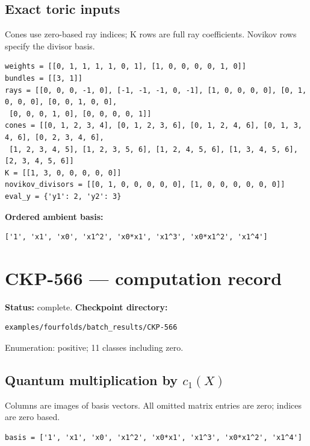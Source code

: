 \documentclass[10pt,a4paper]{article}
\begin{document}
\subsection*{Exact toric inputs}
Cones use zero-based ray indices; K rows are full ray coefficients. Novikov rows specify the divisor basis.

\begin{lstlisting}
weights = [[0, 1, 1, 1, 1, 0, 1], [1, 0, 0, 0, 0, 1, 0]]
bundles = [[3, 1]]
rays = [[0, 0, 0, -1, 0], [-1, -1, -1, 0, -1], [1, 0, 0, 0, 0], [0, 1, 0, 0, 0], [0, 0, 1, 0, 0],
 [0, 0, 0, 1, 0], [0, 0, 0, 0, 1]]
cones = [[0, 1, 2, 3, 4], [0, 1, 2, 3, 6], [0, 1, 2, 4, 6], [0, 1, 3, 4, 6], [0, 2, 3, 4, 6],
 [1, 2, 3, 4, 5], [1, 2, 3, 5, 6], [1, 2, 4, 5, 6], [1, 3, 4, 5, 6], [2, 3, 4, 5, 6]]
K = [[1, 3, 0, 0, 0, 0, 0]]
novikov_divisors = [[0, 1, 0, 0, 0, 0, 0], [1, 0, 0, 0, 0, 0, 0]]
eval_y = {'y1': 2, 'y2': 3}
\end{lstlisting}

\textbf{Ordered ambient basis:}
\begin{lstlisting}
['1', 'x1', 'x0', 'x1^2', 'x0*x1', 'x1^3', 'x0*x1^2', 'x1^4']
\end{lstlisting}

\clearpage\section*{CKP-566 --- computation record}
\textbf{Status:} complete.
\textbf{Checkpoint directory:}
\begin{lstlisting}
examples/fourfolds/batch_results/CKP-566
\end{lstlisting}

Enumeration: positive; 11 classes including zero.
\subsection*{Quantum multiplication by $c_1(X)$}
Columns are images of basis vectors. All omitted matrix entries are zero; indices are zero based.

\begin{lstlisting}
basis = ['1', 'x1', 'x0', 'x1^2', 'x0*x1', 'x1^3', 'x0*x1^2', 'x1^4']
\end{lstlisting}
\end{document}
